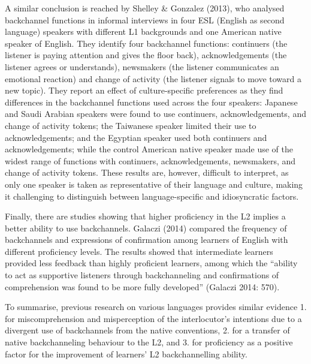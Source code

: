 \begin{styleStandard}
A similar conclusion is reached by Shelley \& Gonzalez (2013), who analysed backchannel functions in informal interviews in four ESL (English as second language) speakers with different L1 backgrounds and one American native speaker of English. They identify four backchannel functions: continuers (the listener is paying attention and gives the floor back), acknowledgements (the listener agrees or understands), newsmakers (the listener communicates an emotional reaction) and change of activity (the listener signals to move toward a new topic). They report an effect of culture-specific preferences as they find differences in the backchannel functions used across the four speakers: Japanese and Saudi Arabian speakers were found to use continuers, acknowledgements, and change of activity tokens; the Taiwanese speaker limited their use to acknowledgements; and the Egyptian speaker used both continuers and acknowledgements; while the control American native speaker made use of the widest range of functions with continuers, acknowledgements, newsmakers, and change of activity tokens. These results are, however, difficult to interpret, as only one speaker is taken as representative of their language and culture, making it challenging to distinguish between language-specific and idiosyncratic factors.
\end{styleStandard}

\begin{styleStandard}
Finally, there are studies showing that higher proficiency in the L2 implies a better ability to use backchannels. Galaczi (2014) compared the frequency of backchannels and expressions of confirmation among learners of English with different proficiency levels. The results showed that intermediate learners provided less feedback than highly proficient learners, among which the “ability to act as supportive listeners through backchanneling and confirmations of comprehension was found to be more fully developed” (Galaczi 2014: 570).
\end{styleStandard}

\begin{styleStandard}
To summarise, previous research on various languages provides similar evidence 1. for miscomprehension and misperception of the interlocutor’s intentions due to a divergent use of backchannels from the native conventions, 2. for a transfer of native backchanneling behaviour to the L2, and 3. for proficiency as a positive factor for the improvement of learners’ L2 backchannelling ability.
\end{styleStandard}

